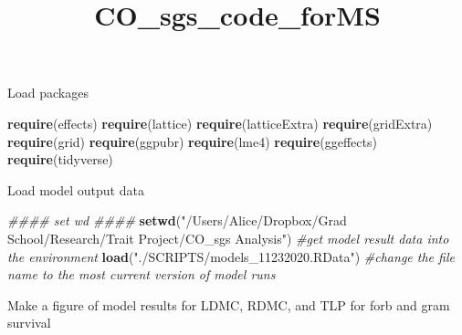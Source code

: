 \documentclass[
]{article}
\title{CO\_sgs\_code\_forMS}
\author{}
\date{\vspace{-2.5em}}
\newenvironment{Shaded}{\begin{snugshade}}{\end{snugshade}}
\newcommand{\CommentTok}[1]{\textcolor[rgb]{0.56,0.35,0.01}{\textit{#1}}}
\newcommand{\KeywordTok}[1]{\textcolor[rgb]{0.13,0.29,0.53}{\textbf{#1}}}
\newcommand{\NormalTok}[1]{#1}
\newcommand{\StringTok}[1]{\textcolor[rgb]{0.31,0.60,0.02}{#1}}
\begin{document}
\maketitle

Load packages

\begin{Shaded}
\begin{Highlighting}[]
\KeywordTok{require}\NormalTok{(effects)}
\KeywordTok{require}\NormalTok{(lattice)}
\KeywordTok{require}\NormalTok{(latticeExtra)}
\KeywordTok{require}\NormalTok{(gridExtra)}
\KeywordTok{require}\NormalTok{(grid)}
\KeywordTok{require}\NormalTok{(ggpubr)}
\KeywordTok{require}\NormalTok{(lme4)}
\KeywordTok{require}\NormalTok{(ggeffects)}
\KeywordTok{require}\NormalTok{(tidyverse)}
\end{Highlighting}
\end{Shaded}

Load model output data

\begin{Shaded}
\begin{Highlighting}[]
\CommentTok{\#\#\#\# set wd \#\#\#\#}
\KeywordTok{setwd}\NormalTok{(}\StringTok{"/Users/Alice/Dropbox/Grad School/Research/Trait Project/CO\_sgs Analysis"}\NormalTok{)}
\CommentTok{\#get model result data into the environment}
\KeywordTok{load}\NormalTok{(}\StringTok{"./SCRIPTS/models\_11232020.RData"}\NormalTok{) }\CommentTok{\#change the file name to the most current version of model runs}
\end{Highlighting}
\end{Shaded}

Make a figure of model results for LDMC, RDMC, and TLP for forb and gram
survival
\end{document}
